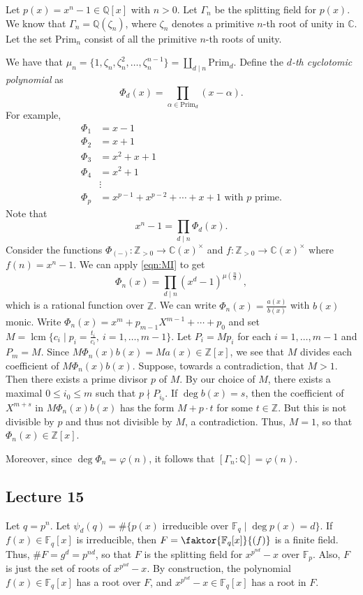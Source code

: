 \documentclass[10pt,letterpaper,cm]{nupset}
\theoremstyle{definition}
\theoremstyle{theorem}
\theoremstyle{remark}
\newcommand{\C}{\mathbb C}
\newcommand{\F}{\mathbb F}
\newcommand{\Q}{\mathbb Q}
\newcommand{\Z}{\mathbb Z}
\newcommand{\1}{\mathbf{1}}
\newcommand{\0}{\vec 0}
\DeclareMathOperator{\lcm}{lcm}
\begin{document}
Let $p(x)= x^n -1 \in \Q[x]$ with $n>0$. Let $\Gamma_n$ be the splitting field for $p(x)$. We know that $\Gamma_n = \Q(\zeta_n)$, where $\zeta_n$ denotes a primitive $n$-th root of unity in $\C$. Let the set $\text{Prim}_n$ consist of all the primitive $n$-th roots of unity. 

We have that $\mu_n = \{1, \zeta_n, \zeta_n^2, \ldots, \zeta_n^{n-1}\} =\coprod_{d\mid n} \text{Prim}_d$. Define the \textit{$d$-th cyclotomic polynomial} as $$\Phi_d(x) = \prod_{\alpha \in \text{Prim}_d}(x-\alpha).$$ 
For example,
\begin{align*}
\Phi_1 & = x-1
\\ \Phi_2 & = x+1
\\ \Phi_3 & = x^2 + x+1
\\ \Phi_4 & =  x^2+1
\\ & \vdots
\\ \Phi_p & = x^{p-1}+x^{p-2}+\cdots + x + 1 \text{ with } p \text{ prime.}
\end{align*}
Note that $$ x^n-1 =\prod_{d\mid n}\Phi_d(x)   .$$ Consider the functions $\Phi_{(-)}:\Z_{>0} \to \C(x)^{\times}$ and $f: \Z_{>0} \to \C(x)^{\times}$ where $f(n) = x^n-1$. We can apply \eqref{eqn:MI} to get $$ \Phi_n(x) = \prod_{d\mid n}(x^d -1)^{\mu\left(\frac{n}{d}\right)} ,$$ which is a rational function over $\Z$. We can write $\Phi_n(x) = \frac{a(x)}{b(x)}$ with $b(x)$ monic. Write $\Phi_n(x) = x^m + p_{m-1}X^{m-1} + \cdots + p_0$ and set $M = \lcm\{c_i \mid p_i = \frac{t_i}{c_i}, \ i=1, \ldots, m-1\}$. Let $P_i = Mp_i$ for each $i=1, \ldots, m-1$ and $P_m = M$. Since $ M\Phi_n(x)b(x) =Ma(x)\in \Z[x]$,  we see that $M$ divides each coefficient of $M\Phi_n(x)b(x)$. Suppose, towards a contradiction, that $M >1$. Then there exists a prime divisor $p$ of $M$. By our choice of $M$, there exists a maximal $0\leq i_0 \leq m$ such that $p \nmid P_{i_0}$. If $\deg{b(x)} =s$, then the coefficient of $X^{m+s}$ in $M\Phi_n(x)b(x)$ has the form $M + p \cdot t$ for some $t\in \Z$. But this is not divisible by $p$ and thus not divisible by $M$, a contradiction.   Thus, $M =1$, so that $\Phi_n(x) \in \Z[x]$. 

Moreover, since $\deg{\Phi_n}= \varphi(n)$, it follows that $\left[\Gamma_n : \Q\right] = \varphi(n)$.


\subsection{Lecture 15}


Let $q= p^n$. Let $\psi_d(q) = \#\{p(x)$ irreducible over $\F_q \mid \deg{p(x)} =d \}$. If $f(x) \in \F_q[x]$ is irreducible, then $F = \faktor{\F_q[x]}{(f)}$ is a finite field. Thus, $\#F = g^d = p^{nd}$, so that $F$ is the splitting field for $x^{p^{nd}}-x$ over $\F_p$. Also, $F$ is just the set of roots of $x^{p^{nd}}-x$.  By construction, the polynomial $f(x) \in \F_q[x]$ has a root over $F$, and $x^{p^{nd}}-x \in \F_q[x]$ has a root in $F$. 
\end{document}
